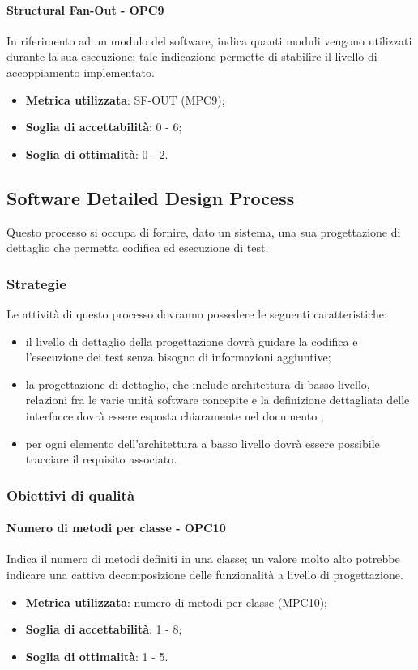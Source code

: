 \documentclass[PdQ.tex]{subfiles}
\begin{document}
			\paragraph{Structural Fan-Out - OPC9}
			In riferimento ad un modulo del software, indica quanti moduli vengono utilizzati durante la
			sua esecuzione; tale indicazione permette di stabilire il livello di accoppiamento implementato.
			\begin{itemize}
					\item \textbf{Metrica utilizzata}: SF-OUT (MPC9);
					\item \textbf{Soglia di accettabilità}: 0 - 6;
					\item \textbf{Soglia di ottimalità}: 0 - 2.
			\end{itemize}
			
	\subsection{Software Detailed Design Process}
		Questo processo si occupa di fornire, dato un sistema, una sua progettazione di dettaglio che permetta codifica ed esecuzione di test.	
	
		\subsubsection{Strategie}
			Le attività di questo processo dovranno possedere le seguenti caratteristiche:
			\begin{itemize}
			\item il livello di dettaglio della progettazione dovrà guidare la codifica e l'esecuzione dei test senza bisogno di informazioni aggiuntive;
			\item la progettazione di dettaglio, che include architettura di basso livello,  relazioni fra le varie unità software concepite e la definizione dettagliata delle interfacce dovrà essere esposta chiaramente nel documento \DPdoc{};
			\item per ogni elemento dell'architettura a basso livello dovrà essere possibile tracciare il requisito associato.
			\end{itemize}
		
		\subsubsection{Obiettivi di qualità}
			\paragraph{Numero di metodi per classe - OPC10}
			Indica il numero di metodi definiti in una classe; un valore molto alto potrebbe indicare una cattiva decomposizione delle funzionalità a livello di progettazione.
			\begin{itemize}
				\item \textbf{Metrica utilizzata}: numero di metodi per classe (MPC10);
				\item \textbf{Soglia di accettabilità}: 1 -  8;
				\item \textbf{Soglia di ottimalità}: 1 - 5.
			\end{itemize}
			
\end{document}
